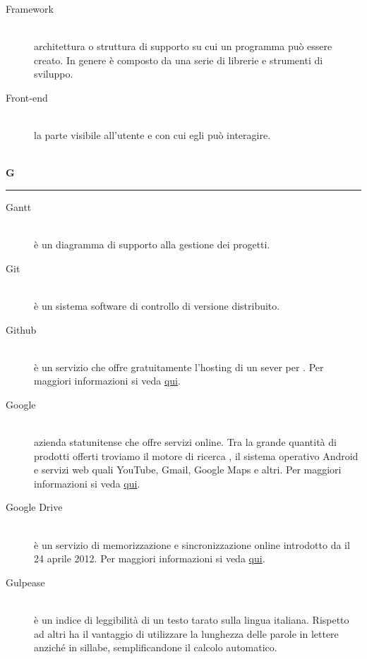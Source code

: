 \documentclass[12pt,a4paper]{article}
\begin{document}
\begin{description}
\item[Framework] 
\hfill\\ architettura o struttura di supporto su cui un programma può essere creato. In genere è composto da una serie di librerie e strumenti di sviluppo.

\item[Front-end] 
\hfill\\la parte visibile all'utente e con cui egli può interagire.
\end{description}

\newpage

\begin{center}
\hfill\\
	\LARGE \textbf{G}
\hfill\\
\rule[15pt]{30pt}{0.5pt}
\end{center}

\begin{description}
\item[Gantt] 
\hfill\\ è un diagramma di supporto alla gestione dei progetti.

\item[Git] 
\hfill\\ è un sistema software di controllo di versione distribuito.

\item[Github] 
\hfill\\ è un servizio che offre gratuitamente l'hosting di un sever per . Per maggiori informazioni si veda \href{https://github.com}{qui}.

\item[Google] 
\hfill\\ azienda statunitense che offre servizi online. Tra la grande quantità di prodotti offerti troviamo il motore di ricerca , il sistema operativo Android e servizi web quali YouTube, Gmail, Google Maps e altri. Per maggiori informazioni si veda \href{https://it.wikipedia.org/wiki/Google_Inc.}{qui}.

\item[Google Drive] 
\hfill\\ è un servizio di memorizzazione e sincronizzazione online introdotto da  il 24 aprile 2012. Per maggiori informazioni si veda \href{https://it.wikipedia.org/wiki/Google_Drive}{qui}.

\item[Gulpease] 
\hfill\\ è un indice di leggibilità di un testo tarato sulla lingua italiana. Rispetto ad altri ha il vantaggio di utilizzare la lunghezza delle parole in lettere anziché in sillabe, semplificandone il calcolo automatico.
\end{description}
\end{document}
